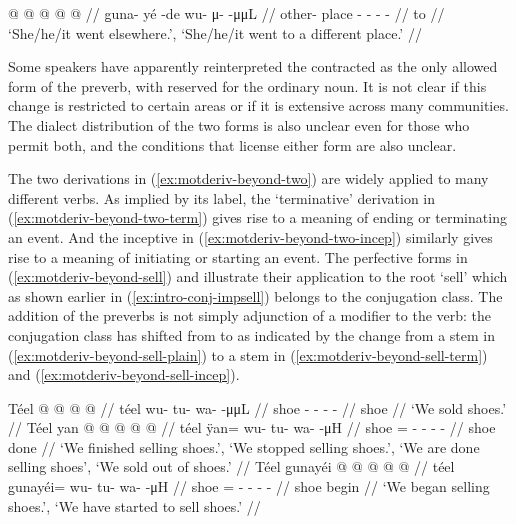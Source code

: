 \documentclass[12pt,letterpaper,oneside,article]{memoir}
\begin{document}
\ex\label{ex:motderiv-beyond-goboat-differentplace}%
\begingl
	\gla	{} @ {} @ {}  @ {} @ {} @ {} //
	\glb	g̱una- yé -de wu- μ-  -μμL //
	\glc	other- place - - -  - //
	\gld	{} {} \·to  {} {} {} //
	\glft	‘She/he/it went elsewhere.’, ‘She/he/it went to a different place.’
		//
\endgl
\xe

Some speakers have apparently reinterpreted the contracted  as the only allowed form of the preverb, with  reserved for the ordinary noun.
It is not clear if this change is restricted to certain areas or if it is extensive across many communities.
The dialect distribution of the two forms is also unclear even for those who permit both, and the conditions that license either form are also unclear.

The two derivations in (\ref{ex:motderiv-beyond-two}) are widely applied to many different verbs.
As implied by its label, the ‘terminative’ derivation in (\ref{ex:motderiv-beyond-two-term}) gives rise to a meaning of ending or terminating an event.
And the inceptive in (\ref{ex:motderiv-beyond-two-incep}) similarly gives rise to a meaning of initiating or starting an event.
The perfective forms in (\ref{ex:motderiv-beyond-sell}) and illustrate their application to the root  ‘sell’ which as shown earlier in (\ref{ex:intro-conj-impsell}) belongs to the  conjugation class.
The addition of the preverbs is not simply adjunction of a modifier to the verb: the conjugation class has shifted from  to  as indicated by the change from a  stem in (\ref{ex:motderiv-beyond-sell-plain}) to a  stem in (\ref{ex:motderiv-beyond-sell-term}) and (\ref{ex:motderiv-beyond-sell-incep}).

\pex\label{ex:motderiv-beyond-sell}%
\a\label{ex:motderiv-beyond-sell-plain}%
%
\begingl
	\gla	Téel  @ {} @ {} @ {} @ {} //
	\glb	téel wu- tu- wa-  -μμL //
	\glc	shoe - - -  - //
	\gld	shoe  {} {} {} {} //
	\glft	‘We sold shoes.’
		//
\endgl
\a\label{ex:motderiv-beyond-sell-term}%
%
\begingl
	\gla	Téel yan @  @ {} @ {} @ {} @ {} //
	\glb	téel ÿan= wu- tu- wa-  -μH //
	\glc	shoe = - - -  - //
	\gld	shoe done\·  {} {} {} {} //
	\glft	‘We finished selling shoes.’, ‘We stopped selling shoes.’, ‘We are done selling shoes’, ‘We sold out of shoes.’
		//
\endgl
\a\label{ex:motderiv-beyond-sell-incep}%
%
\begingl
	\gla	Téel g̱unayéi @  @ {} @ {} @ {} @ {} //
	\glb	téel g̱unayéi= wu- tu- wa-  -μH //
	\glc	shoe = - - -  - //
	\gld	shoe begin\·  {} {} {} {} //
	\glft	‘We began selling shoes.’, ‘We have started to sell shoes.’
		//
\endgl
\xe
\end{document}
